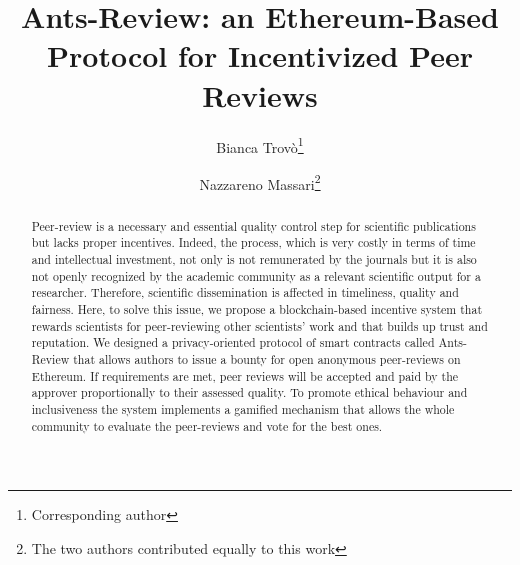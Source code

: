 \documentclass[runningheads]{llncs}
\begin{document}
%
\title{Ants-Review: an Ethereum-Based Protocol for Incentivized Peer Reviews}
%
%
\author{Bianca Trovò\thanks{Corresponding author}\and
Nazzareno Massari\thanks{The two authors contributed equally to this work}}
%
%
%
\maketitle              %
%
\begin{abstract}
Peer-review is a necessary and essential quality control step for scientific publications but lacks proper  incentives. Indeed, the process, which is very costly in terms of time and intellectual investment, not only is not remunerated by the journals but it is also not openly recognized by the academic community as a relevant scientific output for a researcher. Therefore, scientific dissemination is affected in timeliness, quality and fairness. Here, to solve this issue, we propose a blockchain-based incentive system that rewards scientists for peer-reviewing other scientists’ work and that builds up trust and reputation. We designed a privacy-oriented protocol of smart contracts called Ants-Review that allows authors to issue a bounty for open anonymous peer-reviews on Ethereum. If requirements are met, peer reviews will be accepted and paid by the approver proportionally to their assessed quality. To promote ethical behaviour and inclusiveness the system implements a gamified mechanism that allows the whole community to evaluate the peer-reviews and vote for the best ones.
\end{abstract}
%
%
\end{document}
